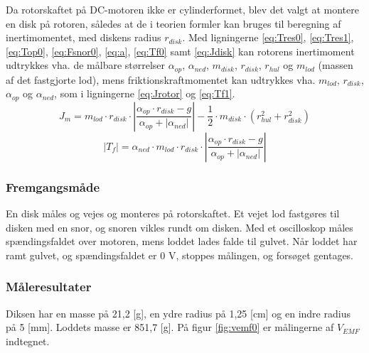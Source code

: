 Da rotorskaftet på DC-motoren ikke er cylinderformet, blev det valgt at montere en disk
på rotoren, således at de i teorien formler kan bruges til beregning af inertimomentet,
med diskens radius \(r_{disk}\).
Med ligningerne \ref{eq:Tres0}, \ref{eq:Tres1}, \ref{eq:Top0}, \ref{eq:Fsnor0}, \ref{eq:a}, \ref{eq:Tf0} samt \ref{eq:Jdisk}
kan rotorens inertimoment udtrykkes vha. de målbare størrelser
\(\alpha_{op}\), \(\alpha_{ned}\), \(m_{disk}\), \(r_{disk}\), \(r_{hul}\) og \(m_{lod}\) (massen af det fastgjorte lod),
mens friktionskraftmomentet kan udtrykkes vha. \(m_{lod}\), \(r_{disk}\), \(\alpha_{op}\) og \(\alpha_{ned}\),
som i ligningerne \ref{eq:Jrotor} og \ref{eq:Tf1}.
\begin{equation}
J_{ m }=m_{ lod }\cdot { r_{ disk } }\cdot \left| \frac { \alpha _{ op }\cdot { r_{ disk } }-g }{ \alpha _{ op }+\left| \alpha _{ ned } \right|  }  \right| -\frac { 1 }{ 2 } \cdot { m_{ disk } }\cdot \left( r_{ hul }^{ 2 }+r_{ disk }^{ 2 } \right) 
	\label{eq:Jrotor}
\end{equation}
\begin{equation}
\left| T_{ f } \right| =\alpha _{ ned }\cdot { m_{ lod } }\cdot { r_{ disk } }\cdot \left| \frac { \alpha _{ op }\cdot { r_{ disk } }-g }{ \alpha _{ op }+\left| \alpha _{ ned } \right|  }  \right| 
	\label{eq:Tf1}
 \end{equation}
\subsubsection{Fremgangsmåde}
En disk måles og vejes og monteres på rotorskaftet.
Et vejet lod fastgøres til disken med en snor, og snoren vikles rundt om disken.
Med et oscilloskop måles spændingsfaldet over motoren, mens loddet lades falde til gulvet.
Når loddet har ramt gulvet, og spændingsfaldet er 0 V, stoppes målingen, og forsøget gentages.
\subsubsection{Måleresultater}
Diksen har en masse på 21,2 [g], en ydre radius på 1,25 [cm] og en indre radius på 5 [mm].
Loddets masse er 851,7 [g].
På figur \ref{fig:vemf0} er målingerne af \(V_{EMF}\) indtegnet.


